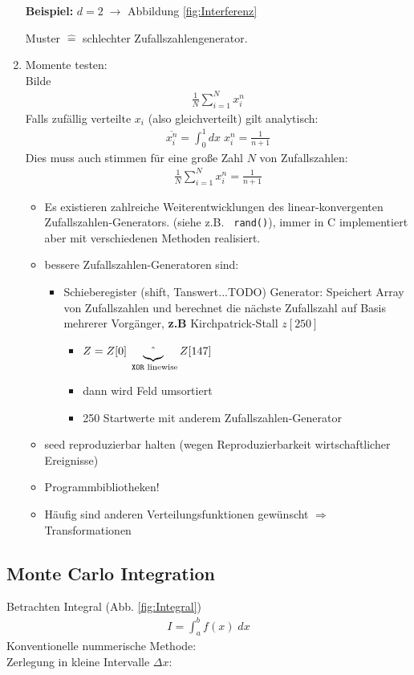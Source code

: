 \documentclass[12pt]{article}
\begin{document}
\begin{enumerate}
\textbf{Beispiel:} $d=2 \; \to$ Abbildung \ref{fig:Interferenz}

Muster $\widehat{=}$ schlechter Zufallszahlengenerator. 

\item Momente testen: \\
Bilde \begin{align}
\frac{1}{N} \sum_{i=1}^N x_i^n
\end{align}
Falls zufällig verteilte $x_i$ (also gleichverteilt) gilt analytisch: \begin{align}
\overline{x_i^n} = \int _0 ^1 dx \; x_i^n = \frac{1}{n+1}
\end{align}
Dies muss auch stimmen für eine große Zahl $N$ von Zufallszahlen:
\begin{align}
\frac{1}{N} \sum_{i=1}^N x_i^n = \frac{1}{n+1}
\end{align}
\begin{itemize}
\item Es existieren zahlreiche Weiterentwicklungen des linear-konvergenten Zufallszahlen-Generators. (siehe z.B. \texttt{ rand()}), immer in C implementiert aber mit verschiedenen Methoden realisiert. 
\item bessere Zufallszahlen-Generatoren sind:
\begin{itemize}
\item Schieberegister (shift, Tanswert...TODO) Generator: Speichert Array von Zufallszahlen und berechnet die nächste Zufallszahl auf Basis mehrerer Vorgänger, \textbf{z.B} Kirchpatrick-Stall %
$z[250]$ \begin{itemize}
\item $Z= Z[0] \underbrace{ \string^ }_\text{ \texttt{XOR} linewise} Z[147]$
\item dann wird Feld umsortiert
\item 250 Startwerte mit anderem Zufallszahlen-Generator %
\end{itemize}
\end{itemize}
\item seed reproduzierbar halten (wegen Reproduzierbarkeit wirtschaftlicher Ereignisse)
\item Programmbibliotheken!
\item Häufig sind anderen Verteilungsfunktionen gewünscht $\Rightarrow $ Transformationen
\end{itemize}

\end{enumerate}


\subsection{ Monte Carlo Integration}
Betrachten Integral (Abb. \ref{fig:Integral})
\begin{align}
I= \int_a^b f(x) \; dx
\end{align}
Konventionelle nummerische Methode: \\
Zerlegung in kleine Intervalle $\Delta x$:
\end{document}
